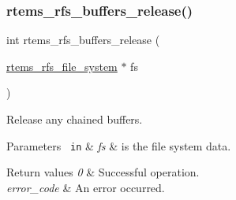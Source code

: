 \subsubsection{\texorpdfstring{rtems\_rfs\_buffers\_release()}{rtems\_rfs\_buffers\_release()}}
{\footnotesize\ttfamily int rtems\+\_\+rfs\+\_\+buffers\+\_\+release (\begin{DoxyParamCaption}\item[{\mbox{\hyperlink{struct__rtems__rfs__file__system}{rtems\+\_\+rfs\+\_\+file\+\_\+system}} $\ast$}]{fs }\end{DoxyParamCaption})}

Release any chained buffers.


\begin{DoxyParams}[1]{Parameters}
\mbox{\texttt{ in}}  & {\em fs} & is the file system data.\\
\hline
\end{DoxyParams}

\begin{DoxyRetVals}{Return values}
{\em 0} & Successful operation. \\
\hline
{\em error\+\_\+code} & An error occurred. \\
\hline
\end{DoxyRetVals}

